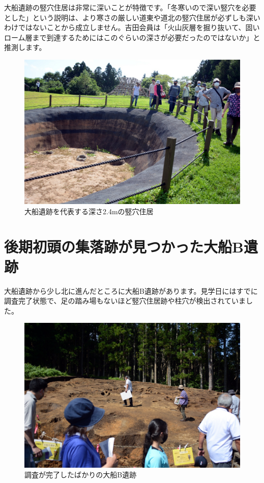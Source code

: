 \documentclass[a4j,11pt,twocolumn,openany]{jsbook}
\begin{document}
大船遺跡の竪穴住居は非常に深いことが特徴です。「冬寒いので深い竪穴を必要とした」という説明は、より寒さの厳しい道東や道北の竪穴住居が必ずしも深いわけではないことから成立しません。吉田会員は「火山灰層を掘り抜いて、固いローム層まで到達するためにはこのぐらいの深さが必要だったのではないか」と推測します。

\begin{figure}[ht]
	\centering
	\includegraphics[width=\linewidth]{fig/01_Iseki_kengaku/08DeepHouse.JPG}
	\caption{大船遺跡を代表する深さ2.4mの竪穴住居}
	\label{}
\end{figure}

\section{後期初頭の集落跡が見つかった大船B遺跡}

大船遺跡から少し北に進んだところに大船B遺跡があります。見学日にはすでに調査完了状態で、足の踏み場もないほど竪穴住居跡や柱穴が検出されていました。

\begin{figure}[ht]
	\centering
	\includegraphics[width=\linewidth]{fig/01_Iseki_kengaku/09_OfuneB_zenkei.JPG}
	\caption{調査が完了したばかりの大船B遺跡}
	\label{}
\end{figure}
\end{document}
